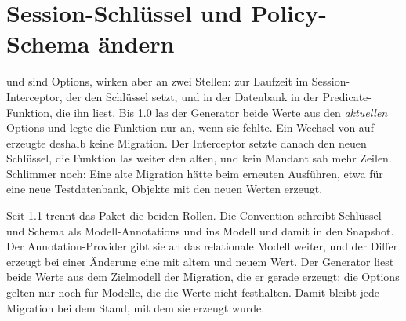 \section{Session-Schlüssel und Policy-Schema ändern}\label{sec:sqlserver-session-settings}

 und  sind Options, wirken aber
an zwei Stellen: zur Laufzeit im Session-Interceptor, der den Schlüssel setzt, und in der
Datenbank in der Predicate-Funktion, die ihn liest. Bis 1.0 las der Generator beide Werte aus
den \emph{aktuellen} Options und legte die Funktion nur an, wenn sie fehlte. Ein Wechsel von
 auf  erzeugte deshalb keine Migration. Der Interceptor setzte
danach den neuen Schlüssel, die Funktion las weiter den alten, und kein Mandant sah mehr Zeilen.
Schlimmer noch: Eine alte Migration hätte beim erneuten Ausführen, etwa für eine neue
Testdatenbank, Objekte mit den neuen Werten erzeugt.

Seit 1.1 trennt das Paket die beiden Rollen. Die Convention schreibt Schlüssel und Schema als
Modell-Annotations 
und 
ins Modell und damit in den Snapshot. Der Annotation-Provider gibt sie an das relationale Modell
weiter, und der Differ erzeugt bei einer Änderung eine
 mit altem und neuem Wert. Der Generator
liest beide Werte aus dem Zielmodell der Migration, die er gerade erzeugt; die Options gelten nur
noch für Modelle, die die Werte nicht festhalten. Damit bleibt jede Migration bei dem Stand,
mit dem sie erzeugt wurde.

